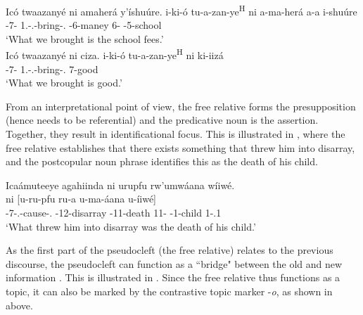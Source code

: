 \documentclass[output=paper]{langscibook}
\begin{document}
\ea
\label{bkm:Ref75772945}
Icó twaazanyé ni amaherá y’íshuúre.  \jambox*{[specificational]}
\gll
i-ki-ó  tu-a-zan-ye\textsuperscript{H}  ni  a-ma-herá  a-a  i-shuúre\\
\AUG{}-7-\PRO{}  1\PL.\SM-\N.\PST{}-bring-\PFV.\REL{}  \COP{}  \AUG{}-6-maney  6-\CONN{}  \AUG{}-5-school\\
\glt
‘What we brought is the school fees.’\\

\ex
\label{bkm:Ref75772952}
Icó twaazanyé ni ciza.  \jambox*{[predicational]}
\gll
i-ki-ó  tu-a-zan-ye\textsuperscript{H}  ni  ki-iizá\\
\AUG{}-7-\PRO{}  1\PL.\SM-\N.\PST{}-bring-\PFV.\REL{}  \COP{}  7-good\\
\glt
‘What we brought is good.’\\

\z

From an interpretational point of view, the free relative forms the presupposition (hence needs to be referential) and the predicative noun is the assertion. Together, they result in identificational focus. This is illustrated in , where the free relative establishes that there exists something that threw him into disarray, and the postcopular noun phrase identifies this as the death of his child.
\pagebreak

\ea
\label{bkm:Ref75860417}
Icaámuteeye agahiinda ni urupfu rw’umwáana wíiwé.\\
\textsuperscript{\TOP}  ni  [u-ru-pfu  ru-a   u-ma-áana  u-íiwé]\textsuperscript{\FOC} \\
{\db}\AUG{}-7-\RMT.\OM{}-cause-\PFV.\REL{}  \AUG-{}12-disarray  \COP{}  {\db}\AUG{}-11-death  11-\CONN{}   \AUG-{}1-child  1-\POSS.1{} \\
\glt
  ‘What threw him into disarray was the death of his child.’\\

\z

As the first part of the pseudocleft (the free relative) relates to the previous discourse, the pseudocleft can function as a ``bridge" between the old and new information \citep[244]{Nshemezimana2016}. This is illustrated in . Since the free relative thus functions as a topic, it can also be marked by the contrastive topic marker -\textit{o}, as shown in  above.
\end{document}
